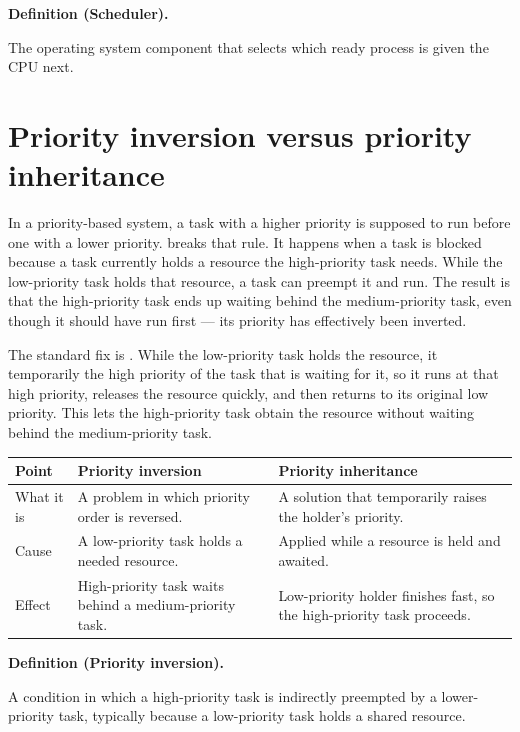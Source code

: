 \documentclass[11pt]{article}
\newenvironment{definitionbox}[1]{%
  \par\noindent\textbf{Definition (#1).}\ \itshape
}{\par\vspace{0.3em}}
\begin{document}
\begin{definitionbox}{Scheduler}
The operating system component that selects which ready process is given the
CPU next.
\end{definitionbox}

\section{Priority inversion versus priority inheritance}
In a priority-based system, a task with a higher priority is supposed to run
before one with a lower priority.  breaks that rule.
It happens when a  task is blocked because a
 task currently holds a resource the high-priority task
needs. While the low-priority task holds that resource, a
 task can preempt it and run. The result is that the
high-priority task ends up waiting behind the medium-priority task, even
though it should have run first --- its priority has effectively been
inverted.

The standard fix is . While the low-priority task
holds the resource, it temporarily  the high priority of the
task that is waiting for it, so it runs at that high priority, releases the
resource quickly, and then returns to its original low priority. This lets the
high-priority task obtain the resource without waiting behind the
medium-priority task.

\begin{center}
\begin{tabular}{p{}p{}p{}}
\toprule
\textbf{Point} & \textbf{Priority inversion} & \textbf{Priority inheritance} \\
\midrule
What it is & A problem in which priority order is reversed. & A solution that temporarily raises the holder's priority. \\
Cause & A low-priority task holds a needed resource. & Applied while a resource is held and awaited. \\
Effect & High-priority task waits behind a medium-priority task. & Low-priority holder finishes fast, so the high-priority task proceeds. \\
\bottomrule
\end{tabular}
\end{center}

\begin{definitionbox}{Priority inversion}
A condition in which a high-priority task is indirectly preempted by a
lower-priority task, typically because a low-priority task holds a shared
resource.
\end{definitionbox}
\end{document}
